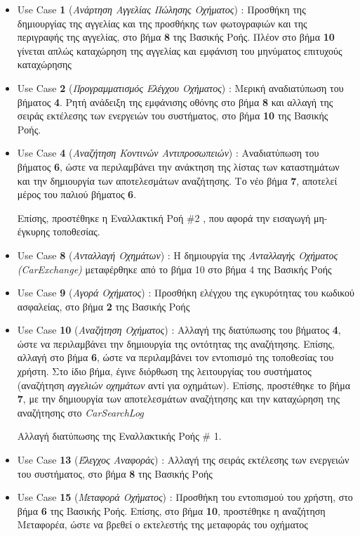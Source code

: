 \documentclass{../ol-softwaremanual}
\begin{document}
	\begin{itemize}
		\item \en Use Case \textbf{1} \gr (\textit{Ανάρτηση Αγγελίας Πώλησης Οχήματος}) : Προσθήκη της δημιουργίας της αγγελίας και της προσθήκης των φωτογραφιών και της περιγραφής της αγγελίας, στο βήμα \textbf{8} της Βασικής Ροής. Πλέον στο βήμα \textbf{10} γίνεται απλώς καταχώρηση της αγγελίας και εμφάνιση του μηνύματος επιτυχούς καταχώρησης 		
		
		\item \en Use Case \textbf{2} \gr (\textit{Προγραμματισμός Ελέγχου Οχήματος}) : Μερική αναδιατύπωση του βήματος \textbf{4}. Ρητή ανάδειξη της εμφάνισης οθόνης στο βήμα \textbf{8} και αλλαγή της σειράς εκτέλεσης των ενεργειών του συστήματος, στο βήμα \textbf{10} της Βασικής Ροής.
		
		
		\item \en Use Case \textbf{4} \gr (\textit{Αναζήτηση Κοντινών Αντιπροσωπειών}) : Αναδιατύπωση του βήματος \textbf{6}, ώστε να περιλαμβάνει την ανάκτηση της λίστας των καταστημάτων και την δημιουργία των αποτελεσμάτων αναζήτησης. Το νέο βήμα \textbf{7}, αποτελεί μέρος του παλιού βήματος \textbf{6}.
		
		Επίσης, προστέθηκε η Εναλλακτική Ροή \en \#2 \gr, που αφορά την εισαγωγή μη-έγκυρης τοποθεσίας.
				
		\item \en Use Case \textbf{8} \gr (\textit{Ανταλλαγή Οχημάτων}) : Η δημιουργία της \textit{Ανταλλαγής Οχήματος \en (CarExchange) \gr} μεταφέρθηκε από το βήμα 10 στο βήμα 4 της Βασικής Ροής
		
		\item \en Use Case \textbf{9} \gr (\textit{Αγορά Οχήματος}) : Προσθήκη ελέγχου της εγκυρότητας του κωδικού ασφαλείας, στο βήμα \textbf{2} της Βασικής Ροής
		
		\item \en Use Case \textbf{10} \gr (\textit{Αναζήτηση Οχήματος}) : Αλλαγή της διατύπωσης του βήματος \textbf{4}, ώστε να περιλαμβάνει την δημιουργία της οντότητας της αναζήτησης. Επίσης, αλλαγή στο βήμα \textbf{6}, ώστε να περιλαμβάνει τον εντοπισμό της τοποθεσίας του χρήστη. Στο ίδιο βήμα, έγινε διόρθωση της λειτουργίας του συστήματος (αναζήτηση \textit{αγγελιών οχημάτων} αντί για οχημάτων). Επίσης, προστέθηκε το βήμα \textbf{7}, με την δημιουργία των αποτελεσμάτων αναζήτησης και την καταχώρηση της αναζήτησης στο \en \textit{CarSearchLog} \gr
		
		Αλλαγή διατύπωσης της Εναλλακτικής Ροής \en \# 1\gr.
	
		
		\item \en Use Case \textbf{13} \gr (\textit{Έλεγχος Αναφοράς}) : Αλλαγή της σειράς εκτέλεσης των ενεργειών του συστήματος, στο βήμα \textbf{8} της Βασικής Ροής
		
		\item \en Use Case \textbf{15} \gr (\textit{Μεταφορά Οχήματος}) : Προσθήκη του εντοπισμού του χρήστη, στο βήμα \textbf{6} της Βασικής Ροής. Επίσης, στο βήμα \textbf{10}, προστέθηκε η αναζήτηση Μεταφορέα, ώστε να βρεθεί ο εκτελεστής της μεταφοράς του οχήματος
		
		
	\end{itemize}
	
\end{document}
